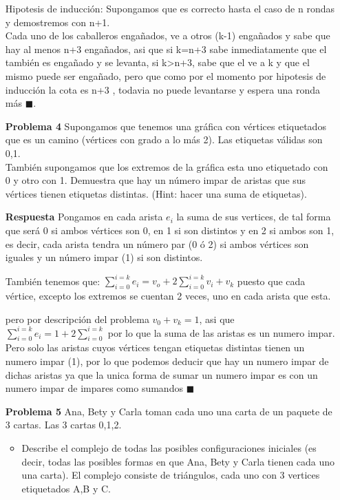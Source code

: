 \documentclass{article}
\begin{document}
\begin{enumerate}
Hipotesis de inducción: Supongamos que es correcto hasta el caso de n rondas y demostremos con n+1.\\
Cada uno de los caballeros engañados, ve a otros (k-1) engañados y sabe que hay al menos n+3 engañados, asi que si k=n+3 sabe inmediatamente que el también es engañado y se levanta, si k>n+3, sabe que el ve a k y que el mismo puede ser engañado, pero que como por el momento por hipotesis de inducción la cota es n+3 , todavia no puede levantarse y espera una ronda más $\blacksquare$.\\



\item[\bf{Problema 4}] Supongamos que tenemos una gráfica con vértices etiquetados que es un camino (vértices con grado a lo más 2). Las etiquetas válidas son 0,1.\\
También supongamos que los extremos de la gráfica esta uno etiquetado con 0 y otro con 1. Demuestra que hay un número impar de aristas que sus vértices tienen etiquetas distintas. (Hint: hacer una suma de etiquetas).

\item[\bf{Respuesta}] 
Pongamos en cada arista $e_i$ la suma de sus vertices, de tal forma que será 0 si ambos vértices son 0, en 1 si son distintos y en 2 si ambos son 1, es decir, cada arista tendra un número par (0 ó 2) si ambos vértices son iguales y un número impar (1) si son distintos.

También tenemos que: $\sum_{i=0}^{i=k} e_i =v_o+2 \sum_{i=0}^{i=k} v_i + v_k $ puesto que cada vértice, excepto los extremos se cuentan 2 veces, uno en cada arista que esta.

pero por descripción del problema $v_0+v_k=1$, asi que $\sum_{i=0}^{i=k} e_i =1+2 \sum_{i=0}^{i=k} $ por lo que la suma de las aristas es un numero impar.\\

Pero solo las aristas cuyos vértices tengan etiquetas distintas tienen un numero impar (1), por lo que podemos deducir que hay un numero impar de dichas aristas ya que la unica forma de sumar un numero impar es con un numero impar de impares como sumandos $\blacksquare$



\item[\bf{Problema 5}] Ana, Bety y Carla toman cada uno una carta de un paquete de 3 cartas. Las 3 cartas 0,1,2.

\begin{itemize}
\item Describe el complejo de todas las posibles configuraciones iniciales
(es decir, todas las posibles formas en que Ana, Bety y Carla tienen
cada uno una carta). El complejo consiste de triángulos, cada uno
con 3 vertices etiquetados A,B y C.


\end{itemize}
\end{enumerate}
\end{document}
